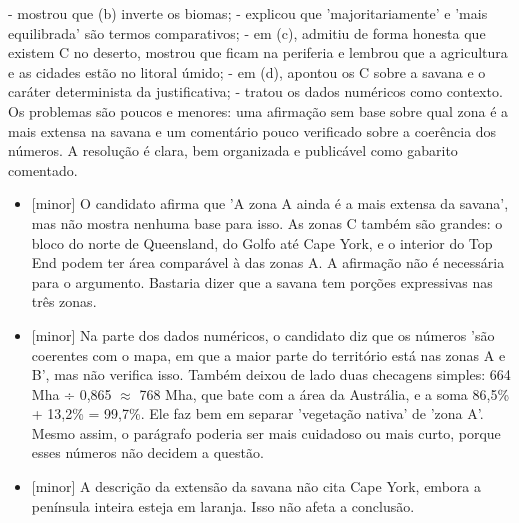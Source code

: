 \documentclass{article}%
\begin{document}
{-} mostrou que (b) inverte os biomas;\newline%
{-} explicou que 'majoritariamente' e 'mais equilibrada' são termos comparativos;\newline%
{-} em (c), admitiu de forma honesta que existem C no deserto, mostrou que ficam na periferia e lembrou que a agricultura e as cidades estão no litoral úmido;\newline%
{-} em (d), apontou os C sobre a savana e o caráter determinista da justificativa;\newline%
{-} tratou os dados numéricos como contexto.\newline%
\newline%
Os problemas são poucos e menores: uma afirmação sem base sobre qual zona é a mais extensa na savana e um comentário pouco verificado sobre a coerência dos números. A resolução é clara, bem organizada e publicável como gabarito comentado.%
\begin{itemize}%
\item%
{[}minor{]} O candidato afirma que 'A zona A ainda é a mais extensa da savana', mas não mostra nenhuma base para isso. As zonas C também são grandes: o bloco do norte de Queensland, do Golfo até Cape York, e o interior do Top End podem ter área comparável à das zonas A. A afirmação não é necessária para o argumento. Bastaria dizer que a savana tem porções expressivas nas três zonas.%
\item%
{[}minor{]} Na parte dos dados numéricos, o candidato diz que os números 'são coerentes com o mapa, em que a maior parte do território está nas zonas A e B', mas não verifica isso. Também deixou de lado duas checagens simples: 664 Mha ÷ 0,865 $\approx$ 768 Mha, que bate com a área da Austrália, e a soma 86,5\% + 13,2\% = 99,7\%. Ele faz bem em separar 'vegetação nativa' de 'zona A'. Mesmo assim, o parágrafo poderia ser mais cuidadoso ou mais curto, porque esses números não decidem a questão.%
\item%
{[}minor{]} A descrição da extensão da savana não cita Cape York, embora a península inteira esteja em laranja. Isso não afeta a conclusão.%
\end{itemize}%
\end{document}
